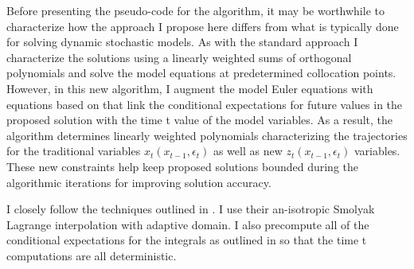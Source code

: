 \documentclass[12pt]{article}
\begin{document}
Before presenting the pseudo-code for the algorithm, it may be worthwhile
to characterize  how the approach I propose here differs from 
what is typically done for solving dynamic stochastic models.
As with the standard approach I characterize the solutions using a linearly
weighted sums of orthogonal polynomials and solve the model equations
at predetermined collocation points. However, in this new algorithm, I 
augment the model Euler equations with equations based on 
 that link the conditional expectations for future values in
the proposed solution with the
time t value of the model variables.  As a result, the algorithm determines
linearly weighted polynomials characterizing the 
trajectories for the traditional
variables $x_t(x_{t-1},\epsilon_t)$ as well as new  $z_t(x_{t-1},\epsilon_t)$ variables.  These new constraints 
help keep proposed solutions bounded during the algorithmic iterations 
for improving solution accuracy.


I closely follow the techniques outlined in \cite{Judd2013,Judd2014}. 
I use their an-isotropic Smolyak Lagrange interpolation with adaptive domain.
I also precompute all of the conditional expectations for the integrals as outlined in \cite{JuddIntegrals} so that the time t computations are all 
deterministic.


\end{document}
